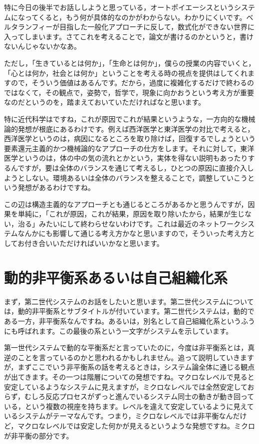 \documentclass{ltjsbook}
\begin{document}
特に今日の後半でお話ししようと思っている，オートポイエーシスというシステムになってくると，もう何が具体的なのかがわからない。わかりにくいです。ベルタランフィーが目指した一般化アプローチに反して，数式化ができない世界に入ってしまいます。さてこれを考えることで，論文が書けるのかというと，書けないんじゃないかなあ。

ただし，「生きているとは何か」，「生命とは何か」，僕らの授業の内容でいくと，「心とは何か，社会とは何か」ということを考える時の視点を提供はしてくれますので，そういう価値はあるんです。だから，過度に複雑化するだけで終わるのではなくて，その観点で，姿勢で，哲学で，現象に向かおうという考え方が重要なのだというのを，踏まえておいていただければなと思います。

特に近代科学はですね，これが原因でこれが結果というような，一方向的な機械論的発想が根底にあるわけです。例えば西洋医学と東洋医学の対比で考えると，西洋医学というのは，病因になるところを取り除けば，回復するでしょうという要素還元主義的かつ機械論的なアプローチの仕方をします。それに対して，東洋医学というのは，体の中の気の流れとかという，実体を得ない説明もあったりするんですが，要は全体のバランスを通じて考えるし，ひとつの原因に直接介入しようとしない。環境あるいは全体のバランスを整えることで，調整していこうという発想があるわけですね。

この辺は構造主義的なアプローチとも通じるところがあるかと思うんですが，因果を単純に，「これが原因，これが結果，原因を取り除いたから，結果が生じない，治る」みたいにして終わらせないわけです。これは最近のネットワークシステムなんかにも影響して通じる考え方かなと思いますので，そういった考え方としてお付き合いいただければいいかなと思います。

\section{動的非平衡系あるいは自己組織化系}

まず，第二世代システムのお話をしたいと思います。第二世代システムについては，動的非平衡系とサブタイトルが付いています。第二世代システムは，動的である一方，非平衡系なんですね。あるいは，別名として自己組織化系というふうにも呼ばれます。この最後の系という一文字がシステムを示しています。

第一世代システムで動的な平衡系だと言っていたのに，今度は非平衡系とは，真逆のことを言っているのかと思われるかもしれません。追って説明していきますが，まずここでいう非平衡系の話を考えるときは，システム論全体に通じる観点が出てきます。その一つは階層についての発想ですね。マクロなレベルで見ると安定しているようなシステムに見えますが，ミクロなレベルでは全然安定しておらず，むしろ反応プロセスがずっと進んでいるシステム同士の動きが動き回っている，という複数の視座を持ちます。レベルを違えて安定しているように見えているシステムがテーマなんです。つまり，ミクロなレベルでは非平衡なんだけど，マクロなレベルでは安定した何かが見えるというような発想ですね。ミクロが非平衡の部分です。
\end{document}
